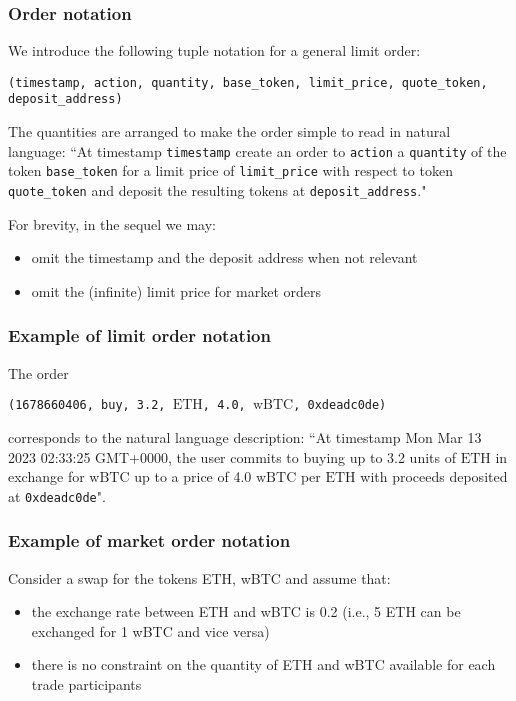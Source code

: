 \documentclass[11pt, reqno]{amsart}
\newcommand{\BTC}{\mathrm{wBTC}}
\newcommand{\ETH}{\mathrm{ETH}}
\begin{document}
\subsubsection{Order notation}
We introduce the following tuple notation for a general limit order:
\begin{center}
	\texttt{(timestamp, action, quantity, base\_token, limit\_price, quote\_token, 
     deposit\_address)}
\end{center}

The quantities are arranged to make the order simple to read in natural
language:
``At timestamp \texttt{timestamp} create an order to \texttt{action} a
\texttt{quantity} of the token \texttt{base\_token} for a limit price of
\texttt{limit\_price} with respect to token \texttt{quote\_token} and deposit
the resulting tokens at \texttt{deposit\_address}."

For brevity, in the sequel we may:
\begin{itemize}
	\item omit the timestamp and the deposit address when not relevant
	\item omit the (infinite) limit price for market orders
\end{itemize}

\subsubsection{Example of limit order notation}
The order
\begin{center}
	\texttt{(1678660406, buy, 3.2, $\ETH$, 4.0, $\BTC$, \texttt{0xdeadc0de})}
\end{center}
corresponds to the natural language description:
``At timestamp Mon Mar 13 2023 02:33:25 GMT+0000, the user commits to buying up
to 3.2 units of $\ETH$ in exchange for $\BTC$ up to a price of 4.0 $\BTC$ per
$\ETH$ with proceeds deposited at \texttt{0xdeadc0de}".

\subsubsection{Example of market order notation}
Consider a swap for the tokens ETH, wBTC and assume that:
\begin{itemize}
\item the exchange rate between ETH and wBTC is 0.2 (i.e., 5 ETH can be
  exchanged for 1 wBTC and vice versa)
\item there is no constraint on the quantity of ETH and wBTC available for each
  trade participants
\end{itemize}
\end{document}
